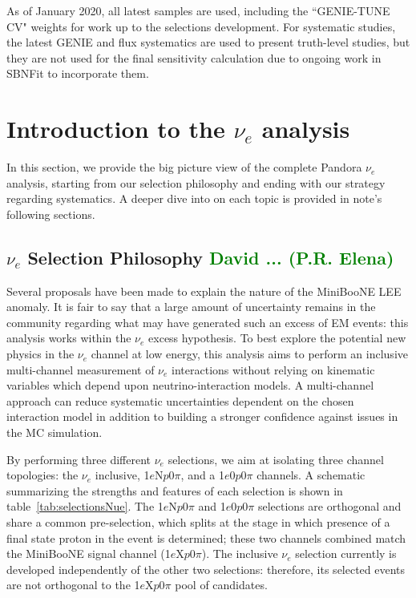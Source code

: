 \documentclass[a4paper]{article}
\begin{document}
\par As of January 2020,  all latest samples are used, including the ``GENIE-TUNE CV" weights for work up to the selections development.
For systematic studies, the latest GENIE and flux systematics are used to present truth-level studies, but they are not used for the final sensitivity calculation due to ongoing work in SBNFit to incorporate them.

\section{Introduction to the $\nu_e$ analysis}
In this section, we provide the big picture view of the complete Pandora $\nu_e$ analysis, starting from our selection philosophy and ending with our strategy regarding systematics. A deeper dive into on each topic is provided in note's following sections. 

\subsection{$\nu_e$ Selection Philosophy \textcolor{green}{David ... (P.R. Elena) }}
\par Several proposals have been made to explain the nature of the MiniBooNE LEE anomaly. It is fair to say that a large amount of uncertainty remains in the community regarding what may have generated such an excess of EM events: this analysis works within the $\nu_e$ excess hypothesis.  To best explore the potential new physics in the $\nu_e$ channel at low energy, this analysis aims to perform an inclusive multi-channel measurement of $\nu_e$ interactions without relying on kinematic variables which depend upon neutrino-interaction models. A multi-channel approach can reduce systematic uncertainties dependent on the chosen interaction model in addition to building a stronger confidence against  issues in the MC simulation.

\par By performing three different $\nu_e$ selections, we aim at isolating three channel topologies: the $\nu_e$ inclusive, 1$e$N$p$0$\pi$, and a 1$e$0$p$0$\pi$ channels. A schematic summarizing the strengths and features of each selection is shown in table~\ref{tab:selectionsNue}. The 1$e$N$p$0$\pi$ and 1$e$0$p$0$\pi$ selections are orthogonal and share a common pre-selection, which splits at the stage in which presence of a final state proton in the event is determined; these two channels combined match the MiniBooNE signal channel (1$e$X$p$0$\pi$). The inclusive $\nu_e$ selection currently is developed independently of the other two selections: therefore, its selected events are not orthogonal to the 1$e$X$p$0$\pi$ pool of candidates.
\end{document}
